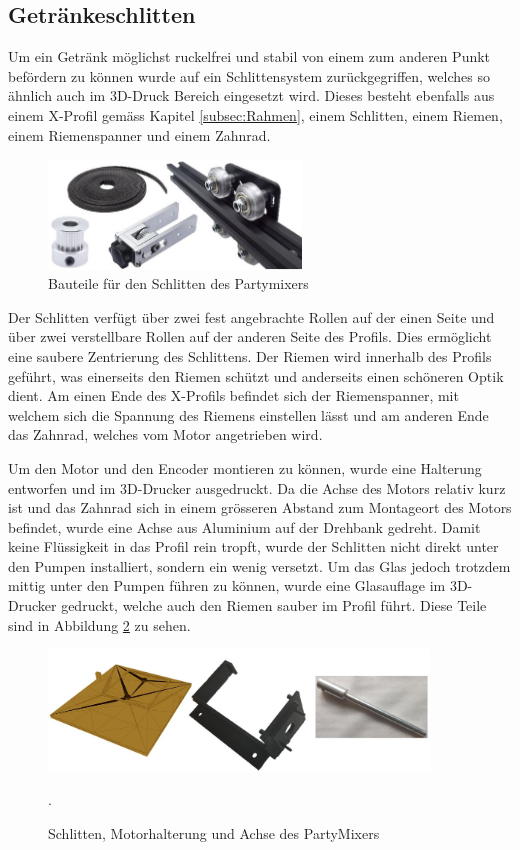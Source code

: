 \subsection{Getränkeschlitten}
\label{subsec:Getränkeschlitten}

Um ein Getränk möglichst ruckelfrei und stabil von einem zum anderen Punkt befördern zu können wurde auf ein Schlittensystem zurückgegriffen, welches so ähnlich auch im 3D-Druck Bereich eingesetzt wird. Dieses besteht ebenfalls aus einem X-Profil gemäss Kapitel \ref{subsec:Rahmen}, einem Schlitten, einem Riemen, einem Riemenspanner und einem Zahnrad. 

\begin{figure}[H]
	\centering
	\includegraphics[width=0.6\textwidth]{graphics/Schlitten}
	\caption{Bauteile für den Schlitten des Partymixers \cite{shop4649026_store_2020_nodate} \cite{super_3d_technology_co_limited_2020_nodate} \cite{super_3d_technology_co_limited_1set_nodate} \cite{super_3d_technology_co_limited_2gtgt2_nodate}}
	\label{fig:Schlitten}
\end{figure}

Der Schlitten verfügt über zwei fest angebrachte Rollen auf der einen Seite und über zwei verstellbare Rollen auf der anderen Seite des Profils. Dies ermöglicht eine saubere Zentrierung des Schlittens. Der Riemen wird innerhalb des Profils geführt, was einerseits den Riemen schützt und anderseits einen schöneren Optik dient. Am einen Ende des X-Profils befindet sich der Riemenspanner, mit welchem sich die Spannung des Riemens einstellen lässt und am anderen Ende das Zahnrad, welches vom Motor angetrieben wird. 

Um den Motor und den Encoder montieren zu können, wurde eine Halterung entworfen und im 3D-Drucker ausgedruckt. Da die Achse des Motors relativ kurz ist und das Zahnrad sich in einem grösseren Abstand zum Montageort des Motors befindet, wurde eine Achse aus Aluminium auf der Drehbank gedreht.  Damit keine Flüssigkeit in das Profil rein tropft, wurde der Schlitten nicht direkt unter den Pumpen installiert, sondern ein wenig versetzt. Um das Glas jedoch trotzdem mittig unter den Pumpen führen zu können, wurde eine Glasauflage im 3D-Drucker gedruckt, welche auch den Riemen sauber im Profil führt. Diese Teile sind in Abbildung \ref{fig:Motorhalterung} zu sehen.    

\begin{figure}[H]
	\centering
	\includegraphics[width=0.9\textwidth]{graphics/Motorhalterung}
	\caption{Schlitten, Motorhalterung und Achse des PartyMixers}.
	\label{fig:Motorhalterung}
\end{figure} 